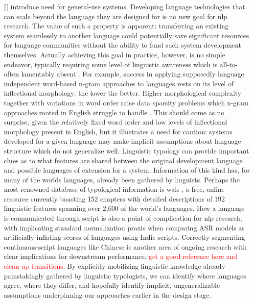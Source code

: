 \documentclass[thesis]{cluu}
\newcounter{paranum}
\newcommand{\numberedparagraph}{\par\refstepcounter{paranum}\textbf{[\theparanum] }}
\newcommand{\todo}[1]{\textcolor{red}{#1}}
\begin{document}
\numberedparagraph introduce need for general-use systems.
Developing language technologies that can scale beyond the language they are designed for is no new goal for \gls{nlp} research. The value of such a property is apparent: transferring an existing system seamlessly to another language could potentially save significant resources for language communities without the ability to fund such system development themselves. Actually achieving this goal in practice, however, is no simple endeavor, typically requiring some level of linguistic awareness which is all-to-often lamentably absent \parencite{benderAchievingEvaluatingLanguageIndependence2011,joshiStateFateLinguistic2021,hedderichSurveyRecentApproaches2021,inter alia}. For example, success in applying supposedly language independent word-based n-gram approaches to languages rests on its level of inflectional morphology: the lower the better. Higher morphological complexity together with variations in word order raise data sparsity problems which n-gram approaches rooted in English struggle to handle \parencite{benderAchievingEvaluatingLanguageIndependence2011}. This should come as no surprise, given the relatively fixed word order and low levels of inflectional morphology present in English, but it illustrates a need for caution: systems developed for a given language may make implicit assumptions about language structure which do not generalize well. Linguistic typology can provide important clues as to what features are shared between the original development language and possible languages of extension for a system. Information of this kind has, for many of the worlds languages, already been gathered by linguists. Perhaps the most renowned database of typological information is \gls{wals} \parencite{matthewdryerWorldAtlasLanguage2024}, a free, online resource currently boasting 152 chapters with detailed descriptions of 192 linguistic features spanning over 2,600 of the world's languages. How a language is communicated through script is also a point of complication for \gls{nlp} research, with \textcite{manoharWhatLostNormalization2024} implicating standard normalization praxis when comparing ASR models as artificially inflating scores of languages using Indic scripts. Correctly segmenting continuous-script languages like Chinese is another area of ongoing research with clear implications for downstream performance. \todo{get a good reference here and clean up transitions}. By explicitly mobilizing linguistic knowledge already painstakingly gathered by linguistic typologists, we can identify where languages agree, where they differ, and hopefully identify implicit, ungeneralizable assumptions underpinning our approaches earlier in the design stage.
\end{document}
